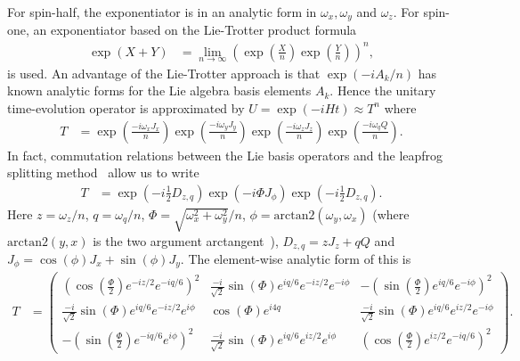 \documentclass{jors}
\begin{document}
		For spin-half, the exponentiator is in an analytic form in $ \omega_x, \omega_y $ and $ \omega_z $. %
		For spin-one, an exponentiator based on the Lie-Trotter product formula~\cite{moler_nineteen_2003}
		\begin{align}
			\exp\left( X + Y\right) &= \lim_{n\to\infty} \left(\exp\left(\frac{X}{n}\right) \exp\left(\frac{Y}{n}\right)\right)^n,\label{eq:lie_trotter}
		\end{align}
		is used.
		An advantage of the Lie-Trotter approach is that $ \exp(-iA_k/n) $ has known analytic forms for the Lie algebra basis elements $ A_k $.
		Hence the unitary time-evolution operator is approximated by $ U = \exp(-iHt) \approx T^n $ where
		\begin{align}
			T &= \exp\left(\frac{-i \omega_x J_x}{n}\right) \exp\left(\frac{-i \omega_y J_y}{n}\right) \exp\left(\frac{-i \omega_z J_z}{n}\right) \exp\left(\frac{-i \omega_q Q}{n}\right).
		\end{align}
		In fact, commutation relations between the Lie basis operators and the leapfrog splitting method~\cite{barthel_optimized_2020} allow us to write 
		\begin{align}
			T &= \exp\left(-i\frac12D_{z,q}\right)\exp(-i\Phi J_\phi)\exp\left(-i\frac12D_{z,q}\right).
		\end{align}
		Here $ z = \omega_z/n $, $q = \omega_q/n $, $ \Phi = \sqrt{\omega_x^2 + \omega_y^2}/n $, $ \phi = \mathrm{arctan}2(\omega_y, \omega_x) $ (where $ \mathrm{arctan}2(y, x) $ is the two argument arctangent~\cite{organick_fortran_1966}), $ D_{z,q} = zJ_z + qQ $ and $ J_\phi = \cos(\phi) J_x + \sin(\phi) J_y $.
		The element-wise analytic form of this is
		\begin{align}
			T &= \begin{pmatrix}
				\left(\cos\left(\frac{\Phi}{2}\right) e^{-iz/2}e^{-iq/6}\right)^2 & \frac{-i}{\sqrt{2}} \sin(\Phi)e^{iq/6}e^{-iz/2}e^{-i\phi} & -\left(\sin\left(\frac{\Phi}{2}\right)e^{iq/6}e^{-i\phi}\right)^2\\
				\frac{-i}{\sqrt{2}} \sin(\Phi)e^{iq/6}e^{-iz/2}e^{i\phi} & \cos(\Phi)e^{i4q} & \frac{-i}{\sqrt{2}} \sin(\Phi)e^{iq/6}e^{iz/2}e^{-i\phi}\\
				-\left(\sin\left(\frac{\Phi}{2}\right)e^{-iq/6}e^{i\phi}\right)^2 & \frac{-i}{\sqrt{2}} \sin(\Phi)e^{iq/6}e^{iz/2}e^{i\phi} & \left(\cos\left(\frac{\Phi}{2}\right) e^{iz/2}e^{-iq/6}\right)^2
			\end{pmatrix}.\label{eq:lie_trotter_4}
		\end{align}
\end{document}

